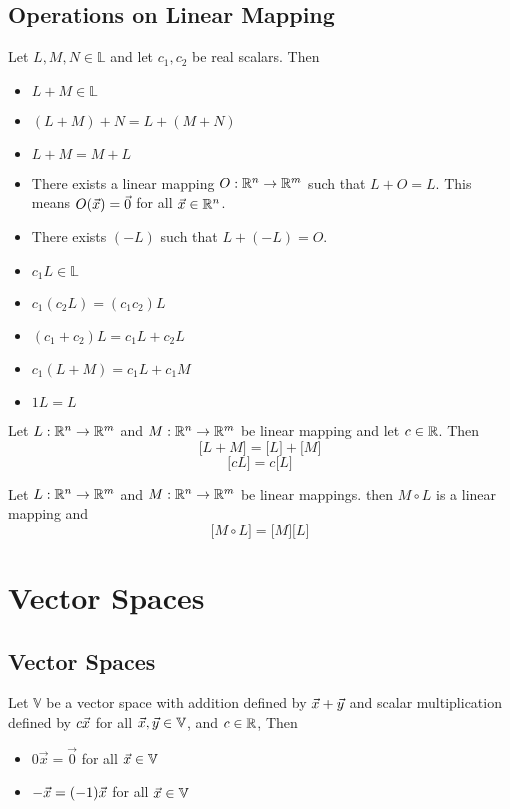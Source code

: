 \documentclass[english,12pt]{article}
\begin{document}
\subsection{Operations on Linear Mapping}

\begin{thrm}
Let $L,M,N \in \mathbb{L}$ and let $c_{1},c_{2}$ be real scalars. Then
\begin{itemize}
\item $L + M \in \mathbb{L}$
\item $(L + M) + N = L + (M + N)$
\item $L + M = M + L$
\item There exists a linear mapping $O: {\mathbb{R}}^n \rightarrow {\mathbb{R}}^m$ such that $L + O = L$. This means $O(\vec{x}) = \vec{0}$ for all $\vec{x} \in {\mathbb{R}}^n$.
\item There exists $(-L)$ such that $L + (-L) = O$.
\item $c_{1} L \in \mathbb{L}$
\item $c_{1} (c_{2} L) = (c_{1} c_{2}) L$
\item $(c_{1} + c_{2}) L = c_{1} L + c_2 L$
\item $c_{1} (L + M) = c_1 L + c_1 M$
\item $1L = L$
\end{itemize}
\end{thrm}

\begin{thrm}
Let $L: {\mathbb{R}}^n \rightarrow {\mathbb{R}}^m$ and $M: {\mathbb{R}}^n \rightarrow {\mathbb{R}}^m$ be linear mapping and let $c \in {\mathbb{R}}$. Then
\[\lbrack L + M \rbrack = \lbrack L \rbrack + \lbrack M \rbrack\]
\[\lbrack cL \rbrack = c \lbrack L \rbrack\]
\end{thrm}

\begin{thrm}
Let $L: {\mathbb{R}}^n \rightarrow {\mathbb{R}}^m$ and $M: {\mathbb{R}}^n \rightarrow {\mathbb{R}}^m$ be linear mappings. then $M \circ L$ is a linear mapping and
\[\lbrack M \circ L \rbrack = \lbrack M \rbrack \lbrack L \rbrack\]
\end{thrm}

\section{Vector Spaces}

\subsection{Vector Spaces}

\begin{thrm}
Let $\mathbb{V}$ be a vector space with addition defined by $\vec{x} + \vec{y}$ and scalar multiplication defined by $c \vec{x}$ for all $\vec{x},\vec{y} \in \mathbb{V}$, and $c \in {\mathbb{R}}$, Then
\begin{itemize}
\item $0 \vec{x} = \vec{0}$ for all $\vec{x} \in \mathbb{V}$
\item $- \vec{x} = (-1)\vec{x}$ for all $\vec{x} \in \mathbb{V}$
\end{itemize}
\end{thrm}
\end{document}
